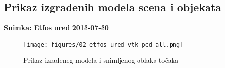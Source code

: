 \newpage
\subsection{Prikaz izgrađenih modela scena i objekata} %
\label{sub:Prikaz izgradenih modela scena i objekata}

\textbf{Snimka: Etfos ured 2013-07-30} 

\begin{figure}[h]
\centering
\texttt{[image: figures/02-etfos-ured-vtk-pcd-all.png]}
\caption{Prikaz izrađenog modela i snimljenog oblaka točaka}
\label{fig:02-etfos-ured-vtk-pcd.png}
\end{figure}




